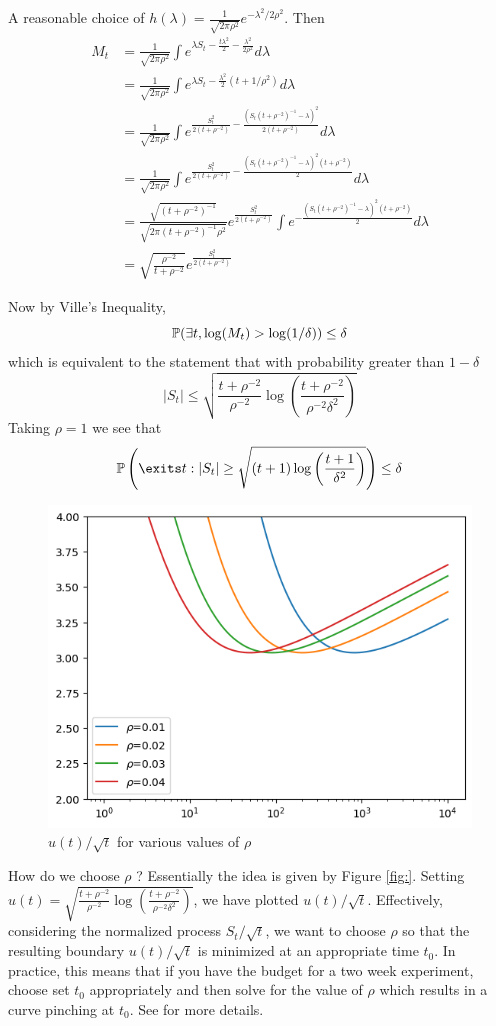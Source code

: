 A reasonable choice of $h(\lambda) = \frac{1}{\sqrt{2\pi \rho^2}} e^{-\lambda^2/2\rho^2}$. Then
\begin{align*}
    M_t
    &= \frac{1}{\sqrt{2\pi \rho^2}} \int e^{\lambda S_t - \frac{t\lambda^2}{2} - \frac{\lambda^2}{2\rho^2} } d\lambda \\
    &= \frac{1}{\sqrt{2\pi \rho^2}} \int e^{\lambda S_t - \frac{\lambda^2}{2}(t+1/\rho^{2})} d\lambda\\
    &= \frac{1}{\sqrt{2\pi \rho^2}} \int e^{\frac{S_t^2}{2(t+\rho^{-2})} - \frac{(S_t(t+\rho^{-2})^{-1}-\lambda)^2}{2(t+\rho^{-2})}} d\lambda \\
    &= \frac{1}{\sqrt{2\pi \rho^2}} \int e^{\frac{S_t^2}{2(t+\rho^{-2})} - \frac{(S_t(t+\rho^{-2})^{-1}-\lambda)^2(t+\rho^{-2})}{2}} d\lambda \\
    &= \frac{\sqrt{(t+\rho^{-2})^{-1}}}{\sqrt{2\pi (t+\rho^{-2})^{-1} \rho^2}} e^{\frac{S_t^2}{2(t+\rho^{-2})}}\int e^{- \frac{(S_t(t+\rho^{-2})^{-1}-\lambda)^2(t+\rho^{-2})}{2}} d\lambda \\
    &= \sqrt{\frac{\rho^{-2}}{t+\rho^{-2}}} e^{\frac{S_t^2}{2(t+\rho^{-2})}}
\end{align*}

Now by Ville's Inequality, 
\[\P(\exists t, \log(M_t) > \log(1/\delta) )\leq \delta\]
which is equivalent to the statement that with probability greater than $1-\delta$
\[|S_t| \leq \sqrt{\frac{t + \rho^{-2}}{\rho^{-2}}\log\left(\frac{t+\rho^{-2}}{\rho^{-2} \delta^2}\right)}\]
Taking $\rho = 1$ we see that 
\[\P\left(\exits t: |S_t| \geq \sqrt{(t+1)\log\left(\frac{t+1}{\delta^2}\right)}\right) \leq \delta\]

\begin{figure}
    \centering
    \includegraphics[width=.5\linewidth]{sprt.png}
    \caption{$u(t)/\sqrt{t}$ for various values of $\rho$}
    \label{fig:my_label}
\end{figure}

How do we choose $\rho$ ? Essentially the idea is given by Figure \ref{fig:}. Setting $u(t) = \sqrt{\frac{t + \rho^{-2}}{\rho^{-2}}\log\left(\frac{t+\rho^{-2}}{\rho^{-2} \delta^2}\right)}$, we have plotted $u(t)/\sqrt{t}$. Effectively, considering the normalized process $S_t/\sqrt{t}$, we want to choose $\rho$ so that the resulting boundary $u(t)/\sqrt{t}$ is minimized at an appropriate time $t_0$. In practice, this means that if you have the budget for a two week experiment, choose set $t_0$ appropriately and then solve for the value of $\rho$ which results in a curve pinching at $t_0$. See \cite{howard2021time} for more details. 


